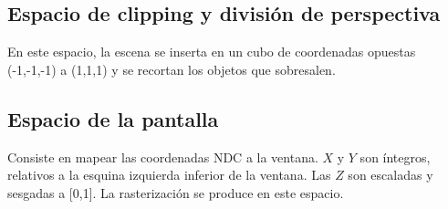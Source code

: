 \subsection{Espacio de clipping y división de perspectiva}
En este espacio, la escena se inserta en un cubo de coordenadas opuestas (-1,-1,-1) a (1,1,1) y se recortan los objetos que sobresalen.

\subsection{Espacio de la pantalla}
Consiste en mapear las coordenadas NDC a la ventana. $X$ y $Y$ son íntegros, relativos a la esquina izquierda inferior de la ventana. Las $Z$ son escaladas y sesgadas a [0,1]. La rasterización se produce en este espacio.
